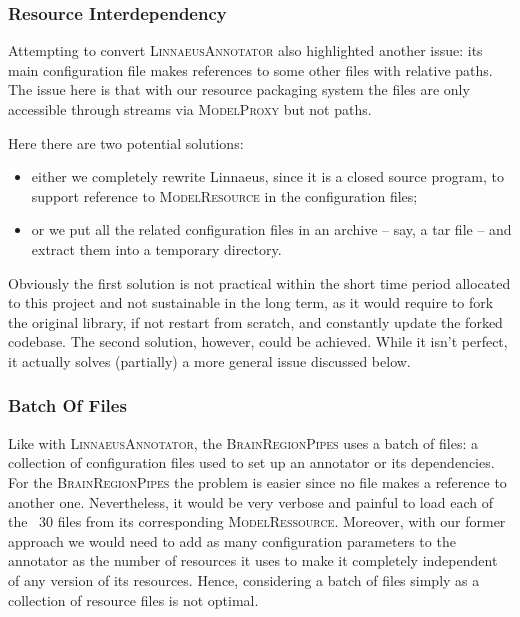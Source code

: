 \documentclass{article}
\newcommand{\ID}[1]{{\textsc{#1}}}
\begin{document}
\subsubsection{Resource Interdependency}

Attempting to convert \ID{LinnaeusAnnotator} also highlighted another issue: its main configuration
file makes references to some other files with relative paths. The issue here is that with our resource packaging system the files are only accessible through streams via \ID{ModelProxy} but not paths.

Here there are two potential solutions:

\begin{itemize}

\item either we completely rewrite Linnaeus, since it is a closed source program, to support reference to \ID{ModelResource} in the configuration files;

\item or we put all the related configuration files in an archive -- say, a tar file -- and extract them into a temporary directory.

\end{itemize}

Obviously the first solution is not practical within the short time period allocated to this project and not sustainable in the long term, as it would require to fork the original library, if not restart from scratch, and constantly update the forked codebase. The second solution, however, could be achieved. While it isn't perfect, it actually solves (partially) a more general issue discussed below.

\subsubsection{Batch Of Files}

Like with \ID{LinnaeusAnnotator}, the \ID{BrainRegionPipes} uses a batch of files: a collection of configuration files used to set up an annotator or its dependencies. For the \ID{BrainRegionPipes} the problem is easier since no file makes a reference to another one. Nevertheless, it would be very verbose and painful to load each of the ~30 files from its corresponding \ID{ModelRessource}. Moreover, with our former approach we would need to add as many configuration parameters to the annotator as the number of resources it uses to make it completely independent of any version of its resources. Hence, considering a batch of files simply as a collection of resource files is not optimal.
\end{document}
